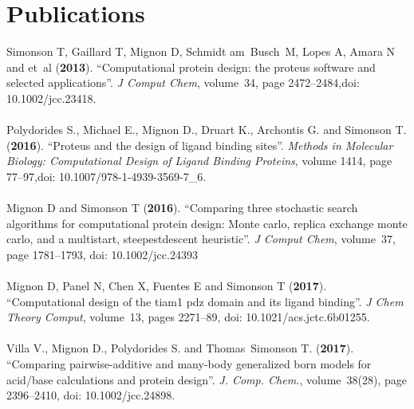 \chapter*{Publications}
\noident Simonson T, Gaillard T, Mignon D, Schmidt am~Busch~M, Lopes A, Amara N and
  et~al (\textbf{2013}).
\newblock \enquote{Computational protein design: the proteus software and
  selected applications}.
\newblock \emph{J Comput Chem}, volume~34, page 2472–2484,doi: 10.1002/jcc.23418.\\ \\
Polydorides S., Michael E., Mignon D., Druart K., Archontis G. and Simonson T.
  (\textbf{2016}).
\newblock \enquote{Proteus and the design of ligand binding sites}.
\newblock \emph{Methods in Molecular Biology: Computational Design of Ligand
  Binding Proteins}, volume 1414, page 77–97,doi: 10.1007/978-1-4939-3569-7_6.\\ \\
Mignon D and Simonson T (\textbf{2016}).
\newblock \enquote{Comparing three stochastic search algorithms for
  computational protein design: Monte carlo, replica exchange monte carlo, and
  a multistart, steepestdescent heuristic}.
\newblock \emph{J Comput Chem}, volume~37, page 1781–1793, doi: 10.1002/jcc.24393\\ \\
Mignon D, Panel N, Chen X, Fuentes E and Simonson T (\textbf{2017}).
\newblock \enquote{Computational design of the tiam1 pdz domain and its ligand
  binding}.
\newblock \emph{J Chem Theory Comput}, volume~13, pages 2271--89, doi: 10.1021/acs.jctc.6b01255.\\ \\
Villa V., Mignon D., Polydorides S. and Thomas~Simonson T. (\textbf{2017}).
\newblock \enquote{Comparing pairwise-additive and many-body generalized born
  models for acid/base calculations and protein design}.
\newblock \emph{J. Comp. Chem.}, volume~38(28), page 2396–2410, doi: 10.1002/jcc.24898. 







